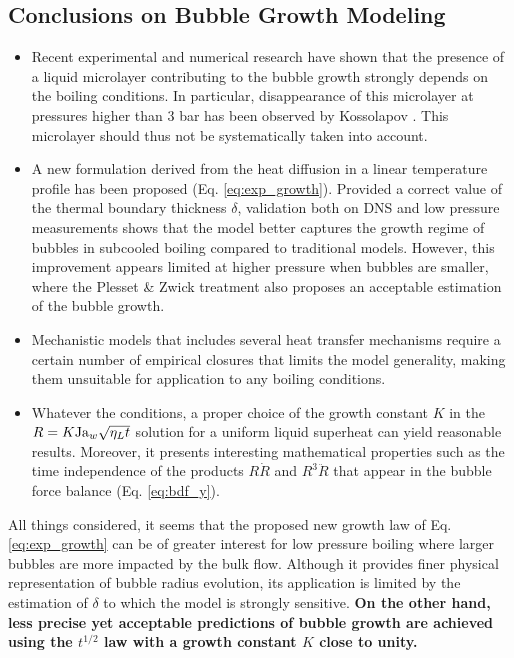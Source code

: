 \subsection{Conclusions on Bubble Growth Modeling}

\begin{itemize}

\item Recent experimental and numerical research have shown that the presence of a liquid microlayer contributing to the bubble growth strongly depends on the boiling conditions. In particular, disappearance of this microlayer at pressures higher than $3$ bar has been observed by Kossolapov \cite{kossolapov_experimental_2021}. This microlayer should thus not be systematically taken into account.

\item A new formulation derived from the heat diffusion in a linear temperature profile has been proposed (Eq. \ref{eq:exp_growth}). Provided a correct value of the thermal boundary thickness $\delta$, validation both on DNS and low pressure measurements shows that the model better captures the growth regime of bubbles in subcooled boiling compared to traditional models. However, this improvement appears limited at higher pressure when bubbles are smaller, where the Plesset \& Zwick treatment also proposes an acceptable estimation of the bubble growth.

\item Mechanistic models that includes several heat transfer mechanisms require a certain number of empirical closures that limits the model generality, making them unsuitable for application to any boiling conditions.

\item Whatever the conditions, a proper choice of the growth constant $K$ in the $R=K\mathrm{Ja}_{w} \sqrt{\eta_{L}t}$ solution for a uniform liquid superheat can yield reasonable results. Moreover, it presents interesting mathematical properties such as the time independence of the products $R \dot{R}$ and $R^{3}\ddot{R}$ that appear in the bubble force balance (Eq. \ref{eq:bdf_y}).

\end{itemize}

All things considered, it seems that the proposed new growth law of Eq. \ref{eq:exp_growth} can be of greater interest for low pressure boiling where larger bubbles are more impacted by the bulk flow. Although it provides finer physical representation of bubble radius evolution, its application is limited by the estimation of $\delta$ to which the model is strongly sensitive. \textbf{On the other hand, less precise yet acceptable predictions of bubble growth are achieved using the $t^{1/2}$ law with a growth constant $K$ close to unity.}




